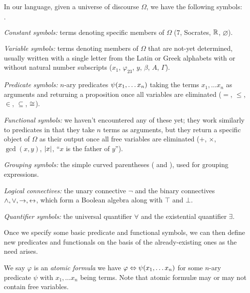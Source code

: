 \begin{definition}
    In our language, given a universe of discourse \(\Omega\), we have the following symbols:
    \begin{list}{\(\cdot\)}{}
        \item
            \emph{Constant symbols:} terms denoting specific members of \(\Omega\)
            (\eg \(7\), Socrates, \(\mathbb{R}\), \(\varnothing\)).
        \item
            \emph{Variable symbols:} terms denoting members of \(\Omega\) that are not-yet determined,
            usually written with a single letter from the Latin or Greek alphabets
            with or without natural number subscripts
            (\eg \(x_1\), \(\varphi_{23}\), \(y\), \(\beta\), \(A\), \(\Gamma\)).
        \item
            \emph{Predicate symbols:} \(n\)-ary predicates \(\psi\pn*{x_1, \dots x_n}\)
            taking the terms \(x_1, \dots x_n\) as arguments and returning a proposition once all variables are eliminated
            (\eg \(=\), \(\leq\), \(\in\), \(\subseteq\), \(\cong\)).
        \item
            \emph{Functional symbols:} we haven't encountered any of these yet;
            they work similarly to predicates in that they take \(n\) terms as arguments,
            but they return a specific object of \(\Omega\) as their output
            once all free variables are eliminated
            (\eg \(+\), \(\times\), \(\gcd(x, y)\), \(\lvert x\rvert\), ``\(x\) is the father of \(y\)'').
        \item
            \emph{Grouping symbols:} the simple curved parentheses ( and ), used for grouping expressions.
        \item
            \emph{Logical connectives:} the unary connective \(\neg\)
            and the binary connectives \(\wedge, \vee, \rightarrow, \leftrightarrow\),
            which form a Boolean algebra along with \(\top\) and \(\bot\).
        \item
            \emph{Quantifier symbols:} the universal quantifier \(\forall\)
            and the existential quantifier \(\exists\).
    \end{list}
    Once we specify some basic predicate and functional symbols,
    we can then define new predicates and functionals on the basis of the already-existing ones
    as the need arises.
\end{definition}

\begin{definition}
    We say \(\varphi\) is an \emph{atomic formula} \iffbydefn
    we have \(\varphi \iff \psi\pn*{x_1, \dots x_n}\) for some \(n\)-ary predicate \(\psi\)
    with \(x_1, \dots x_n\) being terms.
    Note that atomic formul{\ae} may or may not contain free variables.
\end{definition}

